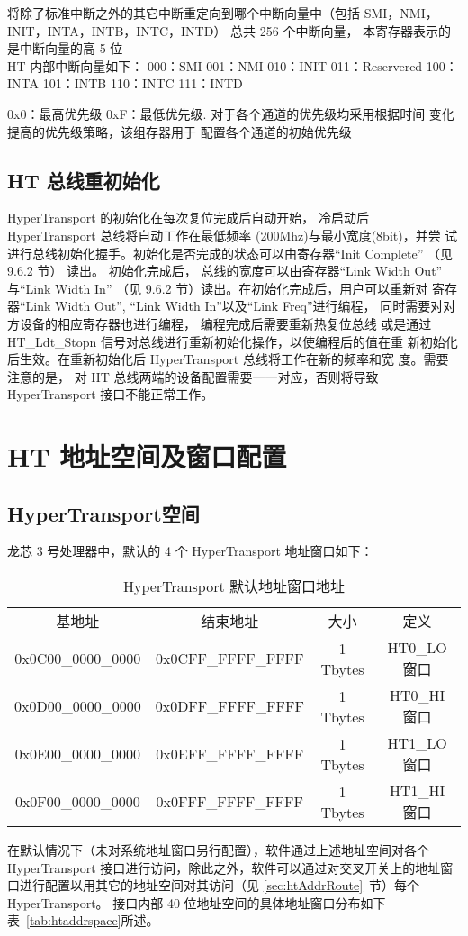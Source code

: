 将除了标准中断之外的其它中断重定向到哪个中断向量中（包括
SMI，NMI， INIT，INTA，INTB，INTC，INTD） 总共 256 个中断向量， 本寄存器表示的是中断向量的高 5 位 \\

HT 内部中断向量如下： 000：SMI 001：NMI 010：INIT 011：Reservered 100：INTA 101：INTB 110：INTC
111：INTD

0x0：最高优先级 0xF：最低优先级.  对于各个通道的优先级均采用根据时间
变化提高的优先级策略，该组存器用于 配置各个通道的初始优先级

\subsection{HT 总线重初始化} \label{subsec:htreinit}

HyperTransport 的初始化在每次复位完成后自动开始， 冷启动后 HyperTransport
总线将自动工作在最低频率 (200Mhz)与最小宽度(8bit)，并尝
试进行总线初始化握手。初始化是否完成的状态可以由寄存器“Init Complete” （见
9.6.2 节） 读出。 初始化完成后， 总线的宽度可以由寄存器“Link Width Out”
与“Link Width In” （见 9.6.2 节）读出。在初始化完成后，用户可以重新对
寄存器“Link Width Out”, “Link Width In”以及“Link Freq”进行编程，
同时需要对对方设备的相应寄存器也进行编程， 编程完成后需要重新热复位总线
或是通过 HT\_Ldt\_Stopn 信号对总线进行重新初始化操作，以使编程后的值在重
新初始化后生效。在重新初始化后 HyperTransport 总线将工作在新的频率和宽
度。需要注意的是， 对 HT 总线两端的设备配置需要一一对应，否则将导致
HyperTransport 接口不能正常工作。

\section{HT 地址空间及窗口配置}\label{sec:htAddrWinConf}

\subsection{HyperTransport空间}

龙芯 3 号处理器中，默认的 4 个 HyperTransport 地址窗口如下：
\begin{table}[htbp]
  \centering
  \begin{tabular}{|c|c|c|c|} \hline
    基地址             & 结束地址           & 大小     & 定义 \\ \hhline
    0x0C00\_0000\_0000 & 0x0CFF\_FFFF\_FFFF & 1 Tbytes & HT0\_LO 窗口 \\
    0x0D00\_0000\_0000 & 0x0DFF\_FFFF\_FFFF & 1 Tbytes & HT0\_HI 窗口 \\
    0x0E00\_0000\_0000 & 0x0EFF\_FFFF\_FFFF & 1 Tbytes & HT1\_LO 窗口 \\
    0x0F00\_0000\_0000 & 0x0FFF\_FFFF\_FFFF & 1 Tbytes & HT1\_HI 窗口 \\ \hline
  \end{tabular}
  \caption{HyperTransport 默认地址窗口地址}
  \label{tab:htdefaddrwin}
\end{table}
在默认情况下（未对系统地址窗口另行配置），软件通过上述地址空间对各个 HyperTransport
接口进行访问，除此之外，软件可以通过对交叉开关上的地址窗口进行配置以用其它的地址空间对其访问（见
\ref{sec:htAddrRoute}~节）每个 HyperTransport。 接口内部 40
位地址空间的具体地址窗口分布如下表~\ref{tab:htaddrspace}所述。

